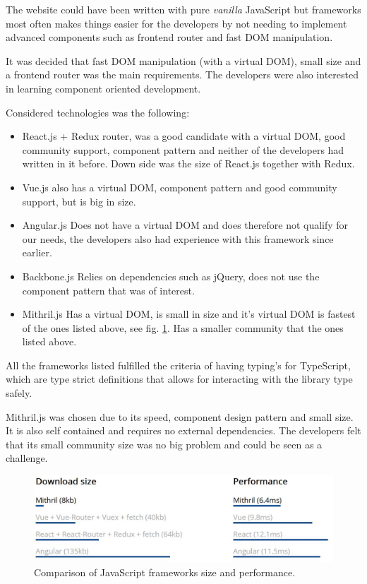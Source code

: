 \documentclass[12pt,a4paper]{report}
\begin{document}
The website could have been written with pure \textit{vanilla} JavaScript but frameworks most often makes things easier for the developers by not needing to implement advanced components such as frontend router and fast DOM manipulation.

It was decided that fast DOM manipulation (with a virtual DOM), small size and a frontend router was the main requirements. The developers were also interested in learning component oriented development.

Considered technologies was the following:
\begin{itemize}
    \item React.js + Redux router, was a good candidate with a virtual DOM, good community support, component pattern and neither of the developers had written in it before. Down side was the size of React.js together with Redux.
    \item Vue.js also has a virtual DOM, component pattern and good community support, but is big in size.
    \item Angular.js Does not have a virtual DOM and does therefore not qualify for our needs, the developers also had experience with this framework since earlier.
    \item Backbone.js Relies on dependencies such as jQuery, does not use the component pattern that was of interest.
    \item Mithril.js Has a virtual DOM, is small in size and it's virtual DOM is fastest of the ones listed above, see fig. \ref{fig:js-comp}. Has a smaller community that the ones listed above.
\end{itemize}

All the frameworks listed fulfilled the criteria of having typing's for TypeScript, which are type strict definitions that allows for interacting with the library type safely.

Mithril.js\cite{mithril-js} was chosen due to its speed, component design pattern and small size. It is also self contained and requires no external dependencies. The developers felt that its small community size was no big problem and could be seen as a challenge.

\begin{figure}[H]
  \centering
  \includegraphics[width=14cm]{mithril-js-perf.jpg}
  \caption{Comparison of JavaScript frameworks size and performance\cite{mithril-speed}.}
  \label{fig:js-comp}
\end{figure}
\end{document}
